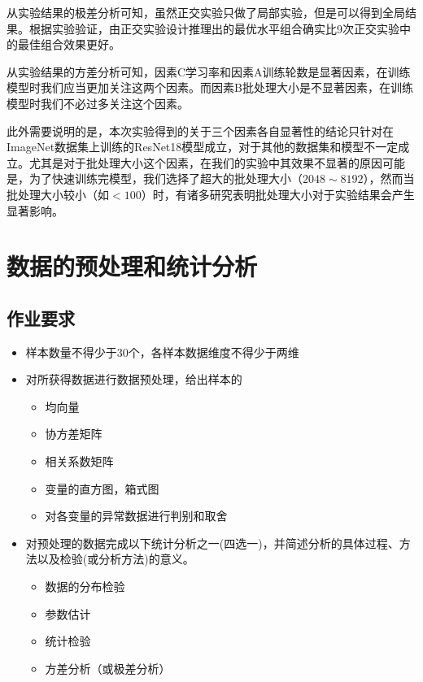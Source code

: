 \documentclass[UTF8]{ctexart}
\begin{document}
	从实验结果的极差分析可知，虽然正交实验只做了局部实验，但是可以得到全局结果。根据实验验证，由正交实验设计推理出的最优水平组合确实比9次正交实验中的最佳组合效果更好。
	
	从实验结果的方差分析可知，因素C学习率和因素A训练轮数是显著因素，在训练模型时我们应当更加关注这两个因素。而因素B批处理大小是不显著因素，在训练模型时我们不必过多关注这个因素。
	
	此外需要说明的是，本次实验得到的关于三个因素各自显著性的结论只针对在ImageNet数据集上训练的ResNet18模型成立，对于其他的数据集和模型不一定成立。尤其是对于批处理大小这个因素，在我们的实验中其效果不显著的原因可能是，为了快速训练完模型，我们选择了超大的批处理大小（$2048 \sim 8192$），然而当批处理大小较小（如$<100$）时，有诸多研究表明批处理大小对于实验结果会产生显著影响。
	
	
	\section{数据的预处理和统计分析}
	
	\subsection{作业要求}
	
	\begin{itemize}
		\item 样本数量不得少于30个，各样本数据维度不得少于两维
		\item 对所获得数据进行数据预处理，给出样本的
		\begin{itemize}
			\item 均向量
			\item 协方差矩阵
			\item 相关系数矩阵
			\item 变量的直方图，箱式图
			\item 对各变量的异常数据进行判别和取舍
		\end{itemize} 
		\item  对预处理的数据完成以下统计分析之一(四选一)，并简述分析的具体过程、方法以及检验(或分析方法)的意义。
		\begin{itemize}
			\item 数据的分布检验
			\item 参数估计
			\item 统计检验
			\item 方差分析（或极差分析）
		\end{itemize} 
	
	\end{itemize} 
\end{document}
